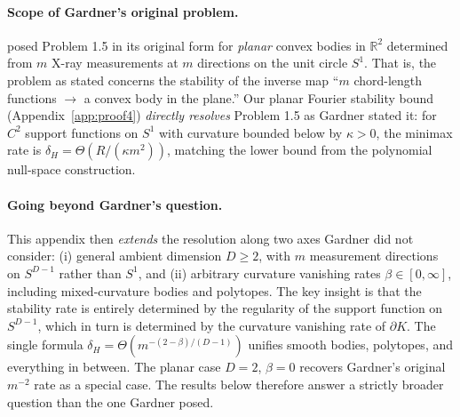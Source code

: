 \documentclass{article}
\begin{document}
\paragraph{Scope of Gardner's original problem.}
\citet{gardner1995geometric, gardner2006geometric} posed Problem 1.5 in
its original form for \emph{planar} convex bodies in $\mathbb{R}^2$
determined from $m$ X-ray measurements at $m$ directions on the unit
circle $S^1$. That is, the problem as stated concerns the stability of
the inverse map ``$m$ chord-length functions $\to$ a convex body in
the plane.'' Our planar Fourier stability bound
(Appendix~\ref{app:proof4}) \emph{directly resolves} Problem 1.5 as
Gardner stated it: for $C^2$ support functions on $S^1$ with curvature
bounded below by $\kappa > 0$, the minimax rate is $\delta_H = \Theta(R
/ (\kappa m^2))$, matching the lower bound from the polynomial
null-space construction.

\paragraph{Going beyond Gardner's question.}
This appendix then \emph{extends} the resolution along two axes
Gardner did not consider: (i) general ambient dimension $D \ge 2$, with
$m$ measurement directions on $S^{D-1}$ rather than $S^1$, and (ii)
arbitrary curvature vanishing rates $\beta \in [0, \infty]$, including
mixed-curvature bodies and polytopes. The key insight is that the
stability rate is entirely determined by the regularity of the support
function on $S^{D-1}$, which in turn is determined by the curvature
vanishing rate of $\partial K$. The single formula
$\delta_H = \Theta(m^{-(2-\beta)/(D-1)})$ unifies smooth bodies,
polytopes, and everything in between. The planar case $D = 2$, $\beta
= 0$ recovers Gardner's original $m^{-2}$ rate as a special case. The
results below therefore answer a strictly broader question than the
one Gardner posed.

\begingroup
\let\oldsection\section
\let\oldsubsection\subsection
\renewcommand{\section}[1]{\subsection*{#1}}
\renewcommand{\subsection}[1]{\subsubsection*{#1}}
\end{document}
